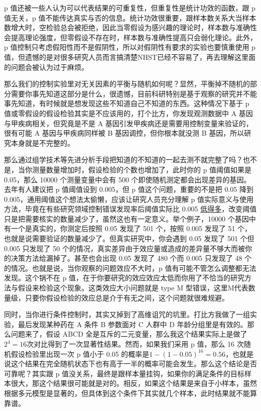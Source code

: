 \documentclass[]{tufte-book}
\begin{document}
p 值还被一些人认为可以代表结果的可重复性，但重复性是统计功效的函数，跟 p 值无关，p 值不能传达真实与否的信息。统计功效很重要，跟样本数关系大当样本数增大时，空检验总会被拒绝，因此当零假设为感兴趣的理论时，样本数与准确性会提高理论强度，但零假设不存在时，样本数与准确性提高只会弱化理论。此外，p 值控制只考虑假阳性而不是假阴性，所以对假阴性有要求的实验也要慎重使用 p 值，但遗憾的是对很多研究人员而言搞清楚NHST已经不容易了，再去理解这里面的问题会被认为过于麻烦。

那么我们的控制实验里对无关因素的平衡与随机如何呢？显然，平衡掉不随机的部分需要你事先知道这部分是什么，很遗憾，目前科研特别是基于观察的研究并不能事先知道，有时候就是想发现这些不知道自己不知道的东西。这种情况下基于 p 值或零假设的假设检验其实是不应该用的，打个比方，你发现观测数据中 A 基因与甲疾病相关，但究竟是不是 A 基因引发甲疾病还是需要用控制变量来验证的，很有可能 A 基因与甲疾病同样被 B 基因调控，但你根本就没测 B 基因，所以研究本身就是不完整的。

那么通过组学技术等先进分析手段把知道的不知道的一起去测不就完整了吗？也不是，当你测量数量增加时，假设检验的个数也增加了，此时你的 p 值阈值如果是 0.05，那么 10000 个测量变量中会有 500 个即使随机测定都会出现差异的基因。去年有人建议把 p 值阈值设到 0.005，但 p 值这个问题，重要的不是把 0.05 降到 0.005，通用阈值这个想法太偷懒，应该让研究人员充分理解 p 值实际意义与使用方法，毕竟在有些研究领域控制错误发现率后阈值实际比 0.005 \href{http://www.nature.com/news/one-size-fits-all-threshold-for-p-values-under-fire-1.22625}{低得多}，改变阈值只是把需要核实的数量减少了，虽然这也有一定意义。举个例子，10000 个基因中有一个是真实的，你测定后按照 0.05 发现了 501 个，按照 0.005 发现了 51 个，也就是说需要验证的数量减少了。但真实研究中，你会遇到 0.05 发现了 501 个但 0.005 只发现了 50 个的情况，真实差异由于效应量或造成的差异量不够大而被你的决策方法给漏掉了。甚至也会出现 0.05 发现了 480 个而 0.005 只发现了 48 个的情况。也就是说，当你观察的问题效应不大时，p 值有可能不管怎么调整都无法发现。这个锅不在 p 值，在于你要研究的效应效应太低而你用了不恰当的研究方法与假设来检验这个现象。这类效应大小问题就是 type M 型错误，这里M代表数量级，只要你假设检验的效应总是介于有无之间，这个问题就很难规避。

同时，当你进行条件控制时，其实又掉到了高维诅咒的坑里。打比方我做了一组实验，最后发现某种药在 A 条件 B 参数面对 C 人群中 D 年龄分组里是有效的。那么问题来了，假设 ABCD 全是互斥的二元变量，那么我这个结果实际上是做了\(2^4 = 16\)次对比得到了一次显著性结果。然而，如果我们采用 p 值，那么 16 次随机假设检验里出现一次 p 值小于 0.05 的概率是\(1-(1-0.05)^{16} = 0.56\)，也就是说这个结果在完全随机状态下也有高于一半的概率可能会发生。那么这个结论是否可靠呢？其实跟 p 值没关系，最终是跟样本量挂钩，如果你的满足条件的目标样本很大，那这个结果很可能就是对的。相反，如果这个结果是来自于小样本，虽然根据多元模型是显著的，但具体到这个条件下其实就几个样本，此时结果就不能算靠谱。
\end{document}
